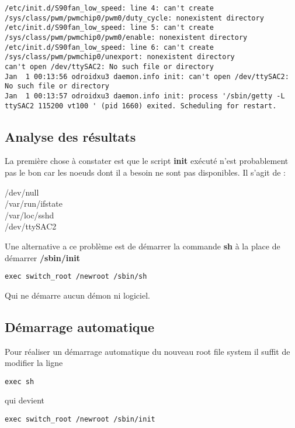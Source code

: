 \begin{lstlisting}[label={lst:switch root},caption=Changement de root file system]
/etc/init.d/S90fan_low_speed: line 4: can't create /sys/class/pwm/pwmchip0/pwm0/duty_cycle: nonexistent directory
/etc/init.d/S90fan_low_speed: line 5: can't create /sys/class/pwm/pwmchip0/pwm0/enable: nonexistent directory
/etc/init.d/S90fan_low_speed: line 6: can't create /sys/class/pwm/pwmchip0/unexport: nonexistent directory
can't open /dev/ttySAC2: No such file or directory
Jan  1 00:13:56 odroidxu3 daemon.info init: can't open /dev/ttySAC2: No such file or directory
Jan  1 00:13:57 odroidxu3 daemon.info init: process '/sbin/getty -L  ttySAC2 115200 vt100 ' (pid 1660) exited. Scheduling for restart.
\end{lstlisting}

\subsection{Analyse des résultats}
La première chose à constater est que le script \textbf{init} exécuté n'est probablement pas le bon car les noeuds dont il a besoin ne sont pas disponibles. Il s'agit de :
\begin{description}
	\item[/dev/null]
	\item[/var/run/ifstate]
	\item[/var/loc/sshd]
	\item[/dev/ttySAC2]
\end{description}
Une alternative a ce problème est de démarrer la commande \textbf{sh} à la place de démarrer \textbf{/sbin/init}
\begin{lstlisting}
exec switch_root /newroot /sbin/sh
\end{lstlisting}
Qui ne démarre aucun démon ni logiciel.

\subsection{Démarrage automatique}
Pour réaliser un démarrage automatique du nouveau root file system il suffit de modifier la ligne
\begin{lstlisting}
exec sh
\end{lstlisting}
qui devient
\begin{lstlisting}
exec switch_root /newroot /sbin/init
\end{lstlisting}

